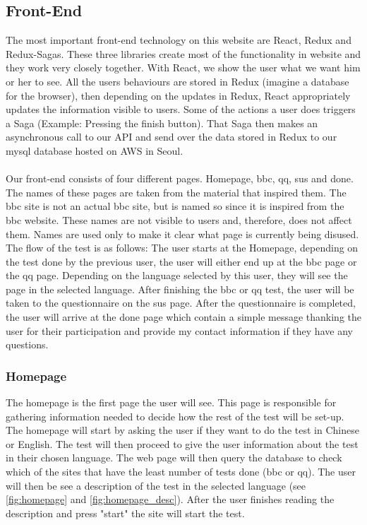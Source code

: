 \subsection{Front-End}
The most important front-end technology on this website are React, Redux and Redux-Sagas. These three libraries create most of the functionality in website and they work very closely together. With React, we show the user what we want him or her to see. All the users behaviours are stored in Redux (imagine a database for the browser), then depending on the updates in Redux, React appropriately updates the information visible to users. Some of the actions a user does triggers a Saga (Example: Pressing the finish button). That Saga then makes an asynchronous call to our API and send over the data stored in Redux to our mysql database hosted on AWS in Seoul. 
\\\\
Our front-end consists of four different pages. Homepage, bbc, qq, sus and done. The names of these pages are taken from the material that inspired them. The bbc site is not an actual bbc site, but is named so since it is inspired from the bbc website. These names are not visible to users and, therefore, does not affect them. Names are used only to make it clear what page is currently being disused. The flow of the test is as follows: The user starts at the Homepage, depending on the test done by the previous user, the user will either end up at the bbc page or the qq page. Depending on the language selected by this user, they will see the page in the selected language. After finishing the bbc or qq test, the user will be taken to the questionnaire on the sus page. After the questionnaire is completed, the user will arrive at the done page which contain a simple message thanking the user for their participation and provide my contact information if they have any questions. 

\subsubsection{Homepage}
The homepage is the first page the user will see. This page is responsible for gathering information needed to decide how the rest of the test will be set-up. The homepage will start by asking the user if they want to do the test in Chinese or English. The test will then proceed to give the user information about the test in their chosen language. The web page will then query the database to check which of the sites that have the least number of tests done (bbc or qq). The user will then be see a description of the test in the selected language (see \ref{fig:homepage} and \ref{fig:homepage_desc}). After the user finishes reading the description and press "start" the site will start the test.

